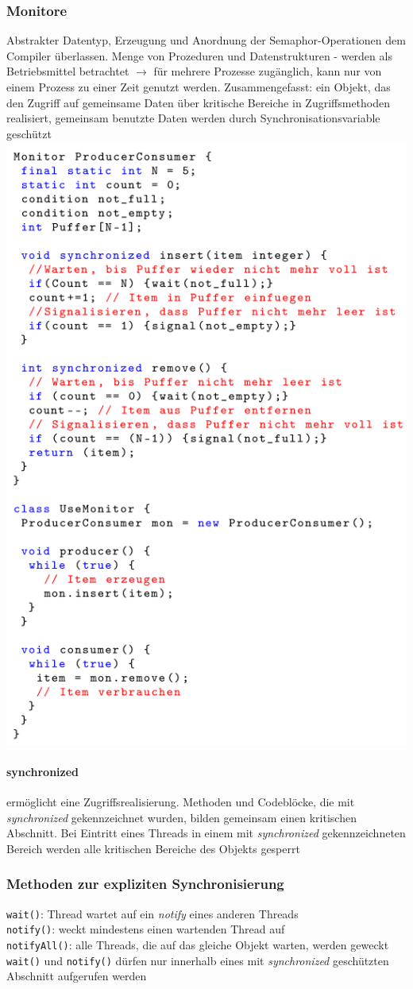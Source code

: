 \documentclass[10pt,a4paper,landscape]{article}
\begin{document}
\begin{multicols*}{3}
	\subsubsection{Monitore}
	Abstrakter Datentyp, Erzeugung und Anordnung der Semaphor-Operationen dem Compiler überlassen. Menge von Prozeduren und Datenstrukturen - werden als Betriebsmittel betrachtet $\rightarrow$ für mehrere Prozesse zugänglich, kann nur von einem Prozess zu einer Zeit genutzt werden. Zusammengefasst: ein Objekt, das den Zugriff auf gemeinsame Daten über kritische Bereiche in Zugriffsmethoden realisiert, gemeinsam benutzte Daten werden durch Synchronisationsvariable geschützt\\
	\includegraphics[width=0.65\columnwidth]{monitor}
	\paragraph{synchronized} ermöglicht eine Zugriffsrealisierung. Methoden und Codeblöcke, die mit \textit{synchronized} gekennzeichnet wurden, bilden gemeinsam einen kritischen Abschnitt. Bei Eintritt eines Threads in einem mit \textit{synchronized} gekennzeichneten Bereich werden alle kritischen Bereiche des Objekts gesperrt
	\subsubsection{Methoden zur expliziten Synchronisierung}
	\texttt{wait()}: Thread wartet auf ein \textit{notify} eines anderen Threads\\
	\texttt{notify()}: weckt mindestens einen wartenden Thread auf \\
	\texttt{notifyAll()}: alle Threads, die auf das gleiche Objekt warten, werden geweckt\\
	\texttt{wait()} und \texttt{notify()} dürfen nur innerhalb eines mit \textit{synchronized} geschützten Abschnitt aufgerufen werden

\end{multicols*}
\end{document}
